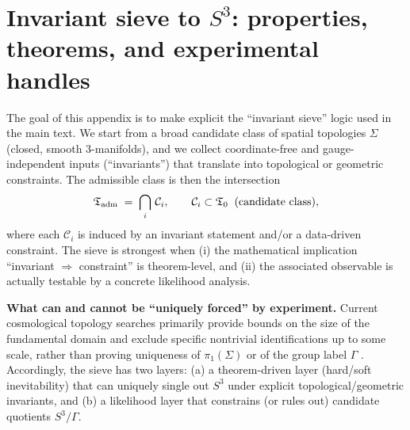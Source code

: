 \documentclass[
  reprint,
  amsmath,amssymb,
  aps,
  prd,
  superscriptaddress,
  nofootinbib,
  longbibliography
]{revtex4-2}
\newcommand{\Sthree}{S^{3}}
\newcommand{\Sig}{\Sigma}
\theoremstyle{definition}
\theoremstyle{remark}
\begin{document}
\section{Invariant sieve to \texorpdfstring{$S^{3}$}{S3}: properties, theorems, and experimental handles}
\label{app:invariant_sieve}
The goal of this appendix is to make explicit the ``invariant sieve'' logic used in the main text.
We start from a broad candidate class of spatial topologies $\Sig$ (closed, smooth 3-manifolds), and we
collect coordinate-free and gauge-independent inputs (``invariants'') that translate into topological or
geometric constraints. The admissible class is then the intersection
\begin{equation}
\mathfrak{T}_{\rm adm} \;=\; \bigcap_{i}\,\mathcal{C}_{i},
\qquad
\mathcal{C}_{i}\subset \mathfrak{T}_{0}\;\;\text{(candidate class)},
\end{equation}
where each $\mathcal{C}_{i}$ is induced by an invariant statement and/or a data-driven constraint.
The sieve is strongest when (i) the mathematical implication ``invariant $\Rightarrow$ constraint'' is
theorem-level, and (ii) the associated observable is actually testable by a concrete likelihood analysis.

\vspace{0.5em}
\noindent\textbf{What can and cannot be ``uniquely forced'' by experiment.}
Current cosmological topology searches primarily provide bounds on the size of the fundamental domain and
exclude specific nontrivial identifications up to some scale, rather than proving uniqueness of
$\pi_{1}(\Sig)$ or of the group label $\Gamma$ \cite{CornishSpergelStarkman1998,Planck2015Topology}.
Accordingly, the sieve has two layers:
(a) a theorem-driven layer (hard/soft inevitability) that can uniquely single out $\Sthree$ under explicit
topological/geometric invariants, and
(b) a likelihood layer that constrains (or rules out) candidate quotients $\Sthree/\Gamma$.
\end{document}
